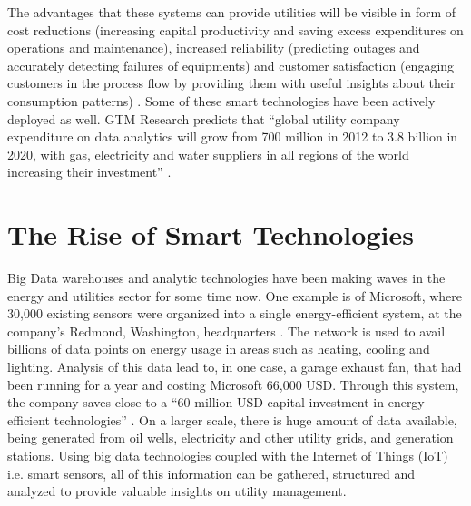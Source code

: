 The advantages that these systems can provide utilities will be visible in form of cost reductions (increasing capital productivity and saving excess expenditures on operations and maintenance), increased reliability (predicting outages and accurately detecting failures of equipments) and customer satisfaction (engaging customers in the process flow by providing them with useful insights about their consumption patterns) \cite{guille02}. Some of these smart technologies have been actively deployed as well. GTM Research predicts that ``global utility company expenditure on data analytics will grow from 700 million in 2012 to 3.8 billion in 2020, with gas, electricity and water suppliers in all regions of the world increasing their investment'' \cite{callahan03}.
   

\section{The Rise of Smart Technologies}
Big Data warehouses and analytic technologies have been making waves in the energy and utilities sector for some time now. One example is of Microsoft, where 30,000 existing sensors were organized into a single energy-efficient system, at the company's Redmond, Washington, headquarters \cite{wharton04}. The network is used to avail billions of data points on energy usage in areas such as heating, cooling and lighting. Analysis of this data lead to, in one case, a garage exhaust fan, that had been running for a year and costing Microsoft 66,000 USD. Through this system, the company saves close to a ``60 million USD capital investment in energy-efficient technologies'' \cite{wharton04}. On a larger scale, there is huge amount of data available, being generated from oil wells, electricity and other utility grids, and generation stations. Using big data technologies coupled with the Internet of Things (IoT) i.e. smart sensors, all of this information can be gathered, structured and analyzed to provide valuable insights on utility management.


